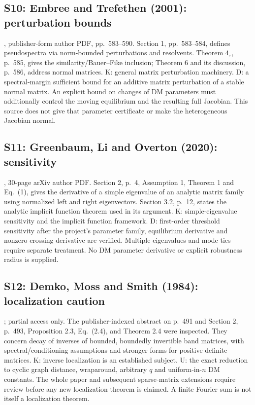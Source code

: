 \subsection{S10: Embree and Trefethen (2001): perturbation bounds}
\label{src:embree}
\cite{EmbreeTrefethen2001}, publisher-form author PDF, pp.~583--590.
Section 1, pp.~583--584, defines pseudospectra via norm-bounded
perturbations and resolvents. Theorem $4_\varepsilon$, p.~585,
gives the similarity/Bauer--Fike inclusion; Theorem 6 and its
discussion, p.~586, address normal matrices. K: general matrix
perturbation machinery. D: a spectral-margin sufficient bound
for an additive matrix perturbation of a stable normal matrix.
An explicit bound on changes of DM parameters must additionally
control the moving equilibrium and the resulting full Jacobian.
This source does not give that parameter certificate or make
the heterogeneous Jacobian normal.

\subsection{S11: Greenbaum, Li and Overton (2020): sensitivity}
\label{src:glo}
\cite{GreenbaumLiOverton2020}, 30-page arXiv author PDF. Section 2,
p.~4, Assumption 1, Theorem 1 and Eq.~(1), gives the derivative
of a simple eigenvalue of an analytic matrix family using
normalized left and right eigenvectors. Section 3.2, p.~12,
states the analytic implicit function theorem used in its
argument. K: simple-eigenvalue sensitivity and the implicit
function framework. D: first-order threshold sensitivity after
the project's parameter family, equilibrium derivative and
nonzero crossing derivative are verified. Multiple eigenvalues
and mode ties require separate treatment. No DM parameter
derivative or explicit robustness radius is supplied.

\subsection{S12: Demko, Moss and Smith (1984): localization caution}
\label{src:demko}
\cite{DemkoMossSmith1984}; partial access only. The publisher-indexed
abstract on p.~491 and Section 2, p.~493, Proposition 2.3,
Eq.~(2.4), and Theorem 2.4 were inspected. They concern decay
of inverses of bounded, boundedly invertible band matrices,
with spectral/conditioning assumptions and stronger forms for
positive definite matrices. K: inverse localization is an
established subject. U: the exact reduction to cyclic graph
distance, wraparound, arbitrary $q$ and uniform-in-$n$ DM
constants. The whole paper and subsequent sparse-matrix
extensions require review before any new localization theorem
is claimed. A finite Fourier sum is not itself a localization
theorem.

